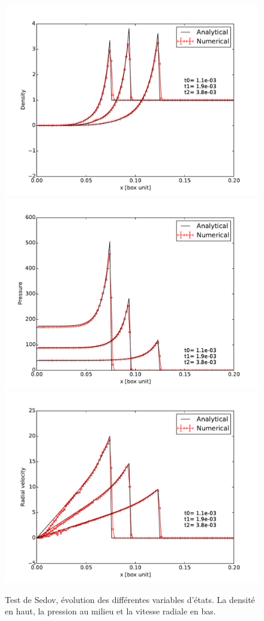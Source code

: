 \begin{figure}[bth]
        \includegraphics[height=.3\textheight]{img/03/sedov/sedov_evol_8_den_lin.pdf} 
		\includegraphics[height=.3\textheight]{img/03/sedov/sedov_evol_8_pres.pdf} 
		\includegraphics[height=.3\textheight]{img/03/sedov/sedov_evol_8_vel.pdf} 
        \caption{Test de Sedov, évolution des différentes variables d'états. La densité en haut, la pression au milieu et la vitesse radiale en bas.}
 		\label{fig:sedov_evol}
\end{figure}
